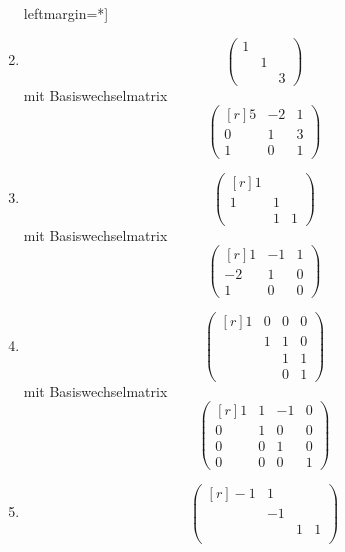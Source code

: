\begin{solution}
  \begin{enumerate}leftmargin=*]
    \item
      \[
        \begin{pmatrix}
          1 &   &   \\
            & 1 &   \\
            &   & 3
        \end{pmatrix}
      \]
      mit Basiswechselmatrix
      \[
        \begin{pmatrix*}[r]
          5 & -2  & 1 \\
          0 &  1  & 3 \\
          1 &  0  & 1
        \end{pmatrix*}
      \]
    \item
      \[
        \begin{pmatrix*}[r]
          1 &   &   \\
          1 & 1 &   \\
            & 1 & 1
        \end{pmatrix*}
      \]
      mit Basiswechselmatrix
      \[
        \begin{pmatrix*}[r]
           1  & -1  & 1 \\
          -2  &  1  & 0 \\
           1  &  0  & 0
        \end{pmatrix*}
      \]
    \item
      \[
        \begin{pmatrix*}[r]
          1 & 0 & 0 & 0 \\
            & 1 & 1 & 0 \\
            &   & 1 & 1 \\
            &   & 0 & 1
        \end{pmatrix*}
      \]
      mit Basiswechselmatrix
      \[
        \begin{pmatrix*}[r]
          1 & 1 & -1 & 0  \\
          0 & 1 &  0 & 0  \\
          0 & 0 &  1 & 0  \\
          0 & 0 &  0 & 1
        \end{pmatrix*}
      \]
    \item
      \[
        \begin{pmatrix*}[r]
          -1  &  1  &   &   \\
              & -1  &   &   \\
              &     & 1 & 1 \\

\end{pmatrix*}\]
\end{enumerate}
\end{solution}
